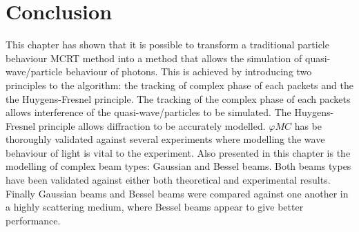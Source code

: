 \FloatBarrier

\section{Conclusion}

This chapter has shown that it is possible to transform a traditional particle behaviour MCRT method into a method that allows the simulation of quasi-wave/particle behaviour of photons.
This is achieved by introducing two principles to the algorithm: the tracking of complex phase of each packets and the the Huygens-Fresnel principle.
The tracking of the complex phase of each packets allows interference of the quasi-wave/particles to be simulated.
The Huygens-Fresnel principle allows diffraction to be accurately modelled.
$\varphi MC$ has be thoroughly validated against several experiments where modelling the wave behaviour of light is vital to the experiment.
Also presented in this chapter is the modelling of complex beam types: Gaussian and Bessel beams.
Both beams types have been validated against either both theoretical and experimental results.
Finally Gaussian beams and Bessel beams were compared against one another in a highly scattering medium, where Bessel beams appear to give better performance.

